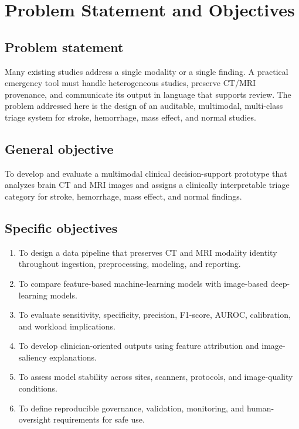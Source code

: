 \documentclass[10pt,a4paper]{article}
\begin{document}
\section{Problem Statement and Objectives}
\subsection{Problem statement}
Many existing studies address a single modality or a single finding. A practical emergency tool must handle heterogeneous studies, preserve CT/MRI provenance, and communicate its output in language that supports review. The problem addressed here is the design of an auditable, multimodal, multi-class triage system for stroke, hemorrhage, mass effect, and normal studies.

\subsection{General objective}
To develop and evaluate a multimodal clinical decision-support prototype that analyzes brain CT and MRI images and assigns a clinically interpretable triage category for stroke, hemorrhage, mass effect, and normal findings.

\subsection{Specific objectives}
\begin{enumerate}[leftmargin=*,nosep]
\item To design a data pipeline that preserves CT and MRI modality identity throughout ingestion, preprocessing, modeling, and reporting.
\item To compare feature-based machine-learning models with image-based deep-learning models.
\item To evaluate sensitivity, specificity, precision, F1-score, AUROC, calibration, and workload implications.
\item To develop clinician-oriented outputs using feature attribution and image-saliency explanations.
\item To assess model stability across sites, scanners, protocols, and image-quality conditions.
\item To define reproducible governance, validation, monitoring, and human-oversight requirements for safe use.
\end{enumerate}
\end{document}

